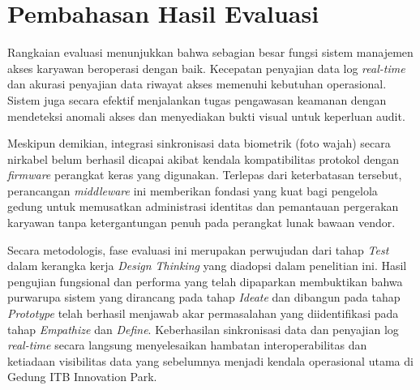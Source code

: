 \section{Pembahasan Hasil Evaluasi}
Rangkaian evaluasi menunjukkan bahwa sebagian besar fungsi sistem manajemen akses karyawan beroperasi dengan baik. Kecepatan penyajian data log \textit{real-time} dan akurasi penyajian data riwayat akses memenuhi kebutuhan operasional. Sistem juga secara efektif menjalankan tugas pengawasan keamanan dengan mendeteksi anomali akses dan menyediakan bukti visual untuk keperluan audit.

Meskipun demikian, integrasi sinkronisasi data biometrik (foto wajah) secara nirkabel belum berhasil dicapai akibat kendala kompatibilitas protokol dengan \textit{firmware} perangkat keras yang digunakan. Terlepas dari keterbatasan tersebut, perancangan \textit{middleware} ini memberikan fondasi yang kuat bagi pengelola gedung untuk memusatkan administrasi identitas dan pemantauan pergerakan karyawan tanpa ketergantungan penuh pada perangkat lunak bawaan vendor.

Secara metodologis, fase evaluasi ini merupakan perwujudan dari tahap \textit{Test} dalam kerangka kerja \textit{Design Thinking} yang diadopsi dalam penelitian ini. Hasil pengujian fungsional dan performa yang telah dipaparkan membuktikan bahwa purwarupa sistem yang dirancang pada tahap \textit{Ideate} dan dibangun pada tahap \textit{Prototype} telah berhasil menjawab akar permasalahan yang diidentifikasi pada tahap \textit{Empathize} dan \textit{Define}. Keberhasilan sinkronisasi data dan penyajian log \textit{real-time} secara langsung menyelesaikan hambatan interoperabilitas dan ketiadaan visibilitas data yang sebelumnya menjadi kendala operasional utama di Gedung ITB Innovation Park.
